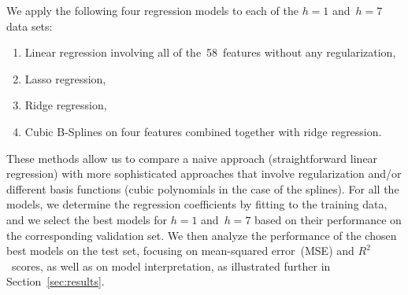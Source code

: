 \documentclass{article}
\begin{document}
We apply the following four regression models to each of the $h = 1$ and~$h = 7$ data sets:
\begin{enumerate}
    \item Linear regression involving all of the~58~features without any regularization,
    \item Lasso regression,
    \item Ridge regression,
    \item Cubic B-Splines on four features combined together with ridge regression.
\end{enumerate}
These methods allow us to compare a naive approach (straightforward linear regression) with more sophisticated approaches that involve regularization and/or different basis functions (cubic polynomials in the case of the splines). For all the models, we determine the regression coefficients by fitting to the training data, and we select the best models for $h = 1$ and~$h = 7$ based on their performance on the corresponding validation set. We then analyze the performance of the chosen best models on the test set, focusing on mean-squared error~(MSE) and $R^2$~scores, as well as on model interpretation, as illustrated further in Section~\ref{sec:results}.
\end{document}
